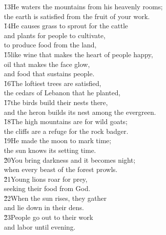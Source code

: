\begin{poetry}
\poeml \v{13}He waters the mountains from his heavenly rooms; \\
\poemll    the earth is satisfied from the fruit of your work. \\
\poeml \v{14}He causes grass to sprout for the cattle \\
\poemll    and plants for people to cultivate, \\
\poemlll       to produce food from the land, \\
\poeml \v{15}like wine that makes the heart of people happy, \\
\poemll    oil that makes the face glow, \\
\poemlll       and food that sustains people. \\
\poeml \v{16}The loftiest trees are satisfied, \\
\poemll    the cedars of Lebanon that he planted, \\
\poeml \v{17}the birds build their nests there, \\
\poemll    and the heron builds its nest among the evergreen. \\
\poeml \v{18}The high mountains are for wild goats; \\
\poemll    the cliffs are a refuge for the rock badger. \\
\poeml \v{19}He made the moon to mark time; \\
\poemll    the sun knows its setting time. \\
\poeml \v{20}You bring darkness and it becomes night; \\
\poemll    when every beast of the forest prowls. \\
\poeml \v{21}Young lions roar for prey, \\
\poemll    seeking their food from God. \\
\poeml \v{22}When the sun rises, they gather \\
\poemll    and lie down in their dens. \\
\poeml \v{23}People go out to their work \\
\poemll    and labor until evening. \\

\end{poetry}

